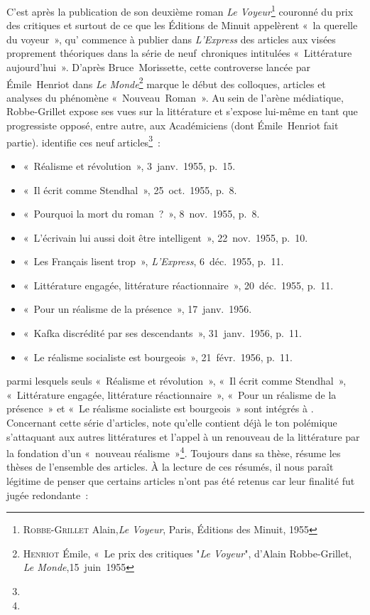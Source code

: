 \documentclass[12pt, a4paper]{article}
\begin{document}
C'est après la publication de son deuxième roman \textit{Le Voyeur}\footnote{\textsc{Robbe-Grillet} Alain,\textit{Le Voyeur}, Paris, Éditions des Minuit, 1955} couronné du prix des critiques et surtout de ce que les Éditions de Minuit appelèrent «~la querelle du voyeur~», qu'\robbe{} commence à publier dans \textit{L'Express} des articles aux visées proprement théoriques dans la série de neuf~chroniques intitulées «~Littérature aujourd'hui~». D'après Bruce~Morissette, cette controverse lancée par Émile~Henriot dans \textit{Le Monde}\footnote{\textsc{Henriot} Émile, «~Le prix des critiques "\textit{Le Voyeur}", d'Alain Robbe-Grillet, \textit{Le Monde},15~juin~1955} marque le début des colloques, articles et analyses du phénomène «~Nouveau~Roman~». Au sein de l'arène médiatique, Robbe-Grillet expose ses vues sur la littérature et s'expose lui-même en tant que progressiste opposé, entre autre, aux Académiciens (dont Émile~Henriot fait partie). \galia{} identifie ces neuf articles\footnote{}~:
\begin{itemize}
    \item «~Réalisme et révolution~», 3~janv.~1955, p.~15.%
    \item «~Il écrit comme Stendhal~», 25~oct.~1955, p.~8.%
    \item «~Pourquoi la mort du roman~?~», 8~nov.~1955, p.~8.%
    \item «~L’écrivain lui aussi doit être intelligent~», 22~nov.~1955, p.~10.%
    \item «~Les Français lisent trop~», \textit{L’Express}, 6~déc.~1955, p.~11.%
    \item «~Littérature engagée, littérature réactionnaire~», 20~déc.~1955, p.~11.%
    \item «~Pour un réalisme de la présence~», 17~janv.~1956.%
    \item «~Kafka discrédité par ses descendants~», 31~janv.~1956, p.~11.%
    \item «~Le réalisme socialiste est bourgeois~», 21~févr.~1956, p.~11.%
\end{itemize}
parmi lesquels seuls «~Réalisme et révolution~», «~Il écrit comme Stendhal~», «~Littérature engagée, littérature réactionnaire~», «~Pour un réalisme de la présence~» et «~Le réalisme socialiste est bourgeois~» sont intégrés à \punr. Concernant cette série d'articles, \galia{} note qu'elle contient déjà le ton polémique s'attaquant aux autres littératures et l'appel à un renouveau de la littérature par la fondation d'un «~nouveau réalisme~»\footnote{}. Toujours dans sa thèse, \galia{} résume les thèses de l'ensemble des articles. À la lecture de ces résumés, il nous paraît légitime de penser que certains articles n'ont pas été retenus car leur finalité fut jugée redondante~:
\end{document}
